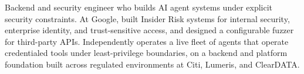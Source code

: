 


Backend and security engineer who builds AI agent systems under explicit security constraints. At Google, built Insider Risk systems for internal security, enterprise identity, and trust-sensitive access, and designed a configurable fuzzer for third-party APIs. Independently operates a live fleet of agents that operate credentialed tools under least-privilege boundaries, on a backend and platform foundation built across regulated environments at Citi, Lumeris, and ClearDATA.








